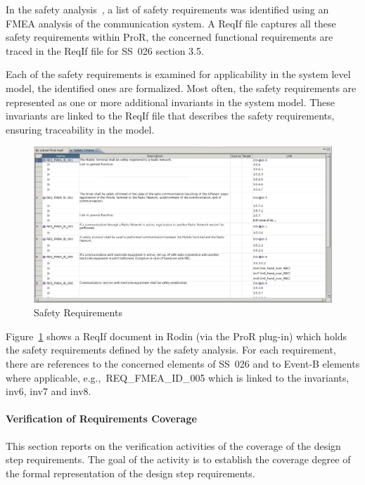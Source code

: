 In the safety analysis~\cite{safetyBrice}, a list of safety requirements was
identified using an FMEA analysis of the communication system. A ReqIf file
captures all these safety requirements within ProR, the concerned functional
requirements are traced in the ReqIf file for SS~026 section 3.5.

Each of the safety requirements is examined for applicability in the system
level model, the identified ones are formalized. Most often, the safety
requirements are represented as one or more additional invariants in the system
model. These invariants are linked to the ReqIf file that describes the safety
requirements, ensuring traceability in the model.

\begin{figure}[ht]
  \centering
  \includegraphics[width=1\textwidth]{figures/ProRSafetyReq}
  \caption{Safety Requirements}
  \label{fig:pror-safety-req}
\end{figure}

Figure~\ref{fig:pror-safety-req} shows a ReqIf document in Rodin (via the ProR
plug-in) which holds the safety requirements defined by the safety analysis. For
each requirement, there are references to the concerned elements of SS~026 and
to Event-B elements where applicable, e.g.,\ {\sf REQ\_FMEA\_ID\_005} which is
linked to the invariants, {\sf inv6}, {\sf inv7} and {\sf inv8}.


\paragraph{Verification of Requirements Coverage}
\label{sec:verif-requ-cover}

This section reports on the verification activities of the coverage of the
design step requirements. The goal of the activity is to establish the coverage
degree of the formal representation of the design step requirements.


